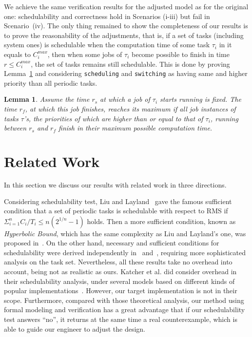 \documentclass[10pt,journal]{IEEEtran}
\newtheorem{lemma}{Lemma}
\begin{document}
{We achieve the same verification results for the adjusted model as for
the original one: schedulability and correctness hold in Scenarios
(i-iii) but fail in Scenario~(iv). The only thing remained to show the
completeness of our results is to prove the reasonability of the
adjustments, that is, if a set of tasks (including system ones) is
schedulable when the computation time of some task $\tau_i$ in it
equals to $C_i^{max}$, then when some jobs of $\tau_i$ become possible
to finish in time $r\le C_i^{max}$, the set of tasks remains still
schedulable. This is done by proving Lemma~\ref{l:max} and considering
\verb|scheduling| and \verb|switching| as having same and higher
priority than all periodic tasks.
\begin{lemma}
\label{l:max}
Assume the time $r_s$ at which a job of $\tau_i$ starts running is
fixed. The time $r_f$, at which this job finishes, reaches its maximum
if all job instances of tasks $\tau$'s, the priorities of which are
higher than or equal to that of $\tau_i$, running between $r_s$ and
$r_f$ finish in their maximum possible computation time.
\end{lemma}
}

\section{Related Work}
\label{s:relate}
In this section we discuss our results with related
work in three directions.

Considering schedulability test, Liu and
Layland~\cite{DBLP:journals/jacm/LiuL73} gave the famous sufficient
condition that a set of periodic tasks is schedulable with respect to
RMS if $\displaystyle \Sigma^n_{i=1} C_i/T_i \le n(2^{1/n}-1)$
holds. Then a more sufficient condition, known as \emph{Hyperbolic
  Bound}, which has the same complexity as Liu and Layland's one, was
proposed in~\cite{DBLP:journals/tc/BiniBB03}. On the other hand,
necessary and sufficient conditions for schedulability were derived
independently in~\cite{DBLP:journals/rts/SpruntSL89}
and~\cite{audsley1993deadline}, requiring more sophisticated analysis
on the task set. Nevertheless, all these results take no overhead into
account, being not as realistic as ours. Katcher et al. did consider
overhead in their schedulability analysis, under several models based
on different kinds of popular
implementations~\cite{DBLP:journals/tse/KatcherAS93}.  However, our
target implementation is not in their scope.  Furthermore, compared
with those theoretical analysis, our method using formal modeling and
verification has a great advantage that if our schedulability test
answers ``no'', it returns at the same time a real counterexample,
which is able to guide our engineer to adjust the design.
\end{document}
